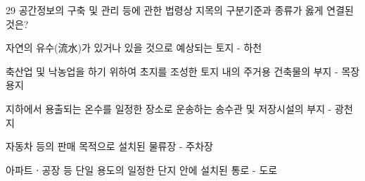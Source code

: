 \begin{question}{29}
공간정보의 구축 및 관리 등에 관한 법령상 지목의 구분기준과 종류가 옳게 연결된 것은?
\begin{choices}
  \item 자연의 유수(流水)가 있거나 있을 것으로 예상되는 토지 - 하천
  \item 축산업 및 낙농업을 하기 위하여 초지를 조성한 토지 내의 주거용 건축물의 부지 - 목장용지
  \item 지하에서 용출되는 온수를 일정한 장소로 운송하는 송수관 및 저장시설의 부지 - 광천지
  \item 자동차 등의 판매 목적으로 설치된 물류장 - 주차장
  \item 아파트ㆍ공장 등 단일 용도의 일정한 단지 안에 설치된 통로 - 도로
\end{choices}
\end{question}
